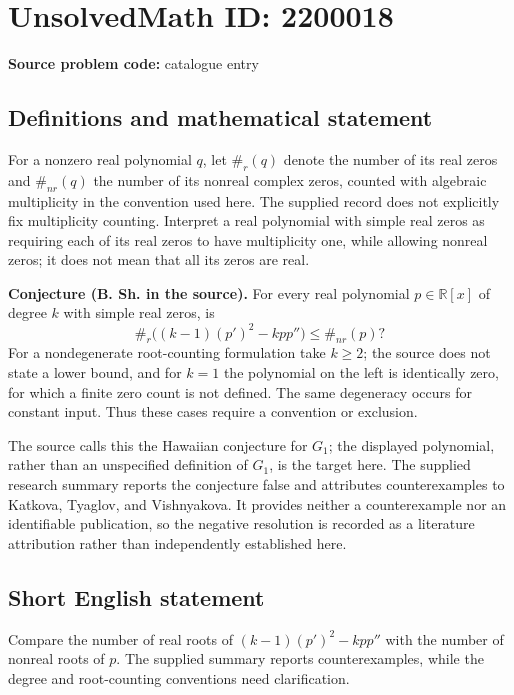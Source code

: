 \documentclass[11pt]{article}
\begin{document}
\section*{UnsolvedMath ID: 2200018}
\textbf{Source problem code:} catalogue entry
\subsection{Definitions and mathematical statement}
For a nonzero real polynomial $q$, let $\#_r(q)$ denote the number of its real zeros and $\#_{nr}(q)$ the number of its nonreal complex zeros, counted with algebraic multiplicity in the convention used here. The supplied record does not explicitly fix multiplicity counting. Interpret a real polynomial with simple real zeros as requiring each of its real zeros to have multiplicity one, while allowing nonreal zeros; it does not mean that all its zeros are real.

\textbf{Conjecture (B. Sh. in the source).} For every real polynomial $p\in\mathbb R[x]$ of degree $k$ with simple real zeros, is
\[
\#_r\big((k-1)(p')^2-kpp''\big)\leq\#_{nr}(p)?
\]
For a nondegenerate root-counting formulation take $k\geq2$; the source does not state a lower bound, and for $k=1$ the polynomial on the left is identically zero, for which a finite zero count is not defined. The same degeneracy occurs for constant input. Thus these cases require a convention or exclusion.

The source calls this the Hawaiian conjecture for $G_1$; the displayed polynomial, rather than an unspecified definition of $G_1$, is the target here. The supplied research summary reports the conjecture false and attributes counterexamples to Katkova, Tyaglov, and Vishnyakova. It provides neither a counterexample nor an identifiable publication, so the negative resolution is recorded as a literature attribution rather than independently established here.
\subsection{Short English statement}
Compare the number of real roots of $(k-1)(p')^2-kpp''$ with the number of nonreal roots of $p$. The supplied summary reports counterexamples, while the degree and root-counting conventions need clarification.
\end{document}
